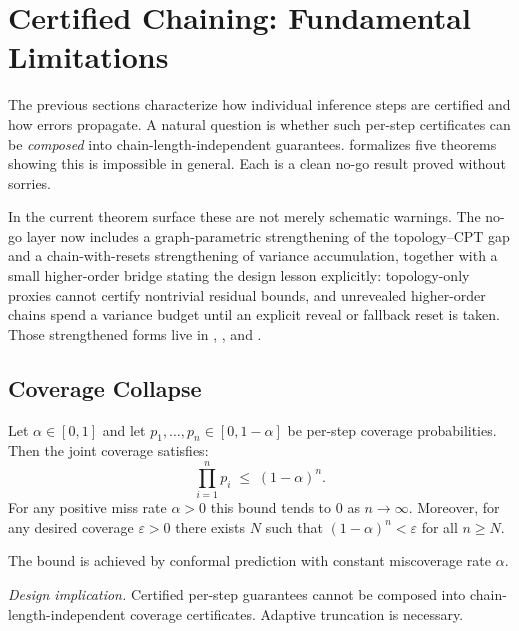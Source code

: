 \documentclass[11pt,openany]{report}
\begin{document}
\section{Certified Chaining: Fundamental Limitations}
\label{sec:certified-chaining-nogo}

The previous sections characterize how individual inference steps are
certified and how errors propagate.  A natural question is whether such
per-step certificates can be \emph{composed} into chain-length-independent
guarantees.  \xiPLN{} formalizes five theorems showing this is impossible in
general.  Each is a clean no-go result proved without sorries.

In the current theorem surface these are not merely schematic warnings.
The no-go layer now includes a graph-parametric strengthening of the
topology--CPT gap and a chain-with-resets strengthening of variance
accumulation, together with a small higher-order bridge stating the design
lesson explicitly: topology-only proxies cannot certify nontrivial residual
bounds, and unrevealed higher-order chains spend a variance budget until an
explicit reveal or fallback reset is taken.  Those strengthened forms live in
,
, and
.

\subsection*{Coverage Collapse}

\boundarystart
\begin{theorem}
\label{thm:coverage-collapse}
Let $\alpha \in [0,1]$ and let $p_1,\dots,p_n \in [0, 1-\alpha]$ be
per-step coverage probabilities.  Then the joint coverage satisfies:
\[
  \prod_{i=1}^{n} p_i \;\le\; (1-\alpha)^n.
\]
For any positive miss rate $\alpha > 0$ this bound tends to $0$ as
$n \to \infty$.  Moreover, for any desired coverage $\varepsilon > 0$ there
exists $N$ such that $(1-\alpha)^n < \varepsilon$ for all $n \ge N$.

The bound is achieved by conformal prediction with constant miscoverage
rate $\alpha$.
\end{theorem}
\boundaryend

\textit{Design implication.}  Certified per-step guarantees cannot be
composed into chain-length-independent coverage certificates.  Adaptive
truncation is necessary.
\end{document}
